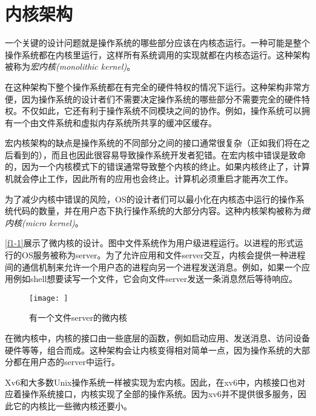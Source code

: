 \section*{内核架构}
一个关键的设计问题就是操作系统的哪些部分应该在内核态运行。一种可能是整个操作系统都在内核里运行，这样所有系统调用的实现就都在内核态运行。这种架构被称为\emph{宏内核(monolithic kernel)}。

在这种架构下整个操作系统都在有完全的硬件特权的情况下运行。这种架构非常方便，因为操作系统的设计者们不需要决定操作系统的哪些部分不需要完全的硬件特权。不仅如此，它还有利于操作系统不同模块之间的协作。例如，操作系统可以拥有一个由文件系统和虚拟内存系统所共享的缓冲区缓存。

宏内核架构的缺点是操作系统的不同部分之间的接口通常很复杂（正如我们将在之后看到的），而且也因此很容易导致操作系统开发者犯错。在宏内核中错误是致命的，因为一个内核模式下的错误通常导致整个内核的终止。如果内核终止了，计算机就会停止工作，因此所有的应用也会终止。计算机必须重启才能再次工作。

为了减少内核中错误的风险，OS的设计者们可以最小化在内核态中运行的操作系统代码的数量，并在用户态下执行操作系统的大部分内容。这种内核架构被称为\emph{微内核(micro kernel)}。

\autoref{f1-1}展示了微内核的设计。图中文件系统作为用户级进程运行。以进程的形式运行的OS服务被称为server。为了允许应用和文件server交互，内核会提供一种进程间的通信机制来允许一个用户态的进程向另一个进程发送消息。例如，如果一个应用例如shell想要读写一个文件，它会向文件server发送一条消息然后等待响应。

\begin{figure}[htbp]
    \centering
    \texttt{[image: ]}
    \caption{有一个文件server的微内核}
    \label{f1-1}
\end{figure}

在微内核中，内核的接口由一些底层的函数，例如启动应用、发送消息、访问设备硬件等等，组合而成。这种架构会让内核变得相对简单一点，因为操作系统的大部分都在用户态的server中运行。

Xv6和大多数Unix操作系统一样被实现为宏内核。因此，在xv6中，内核接口也对应着操作系统接口，内核实现了全部的操作系统。因为xv6并不提供很多服务，因此它的内核比一些微内核还要小。


